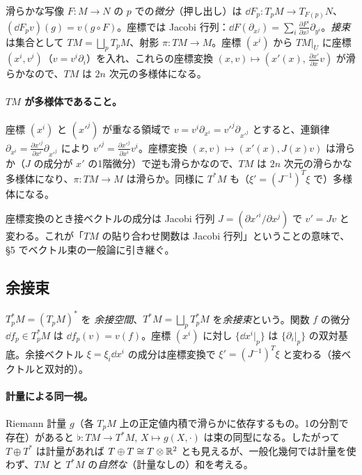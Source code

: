 \begin{defn}[微分、接束]
滑らかな写像 $F:M\to N$ の $p$ での\emph{微分}（押し出し）は $\dd F_p:T_pM\to T_{F(p)}N$、$(\dd F_p v)(g)=v(g\circ F)$。座標では Jacobi 行列：$\dd F(\partial_{x^j})=\sum_i \frac{\partial F^i}{\partial x^j}\partial_{y^i}$。\emph{接束}は集合として $TM=\bigsqcup_p T_pM$、射影 $\pi:TM\to M$。座標 $(x^i)$ から $TM|_U$ に座標 $(x^i,v^i)$（$v=v^i\partial_i$）を入れ、これらの座標変換 $(x,v)\mapsto(x'(x),\,\frac{\partial x'}{\partial x}v)$ が滑らかなので、$TM$ は $2n$ 次元の多様体になる。
\end{defn}

\paragraph{$TM$ が多様体であること。}座標 $(x^i)$ と $(x'^j)$ が重なる領域で $v=v^i\partial_{x^i}=v'^j\partial_{x'^j}$ とすると、連鎖律 $\partial_{x^i}=\frac{\partial x'^j}{\partial x^i}\partial_{x'^j}$ により $v'^j=\frac{\partial x'^j}{\partial x^i}v^i$。座標変換 $(x,v)\mapsto(x'(x),J(x)v)$ は滑らか（$J$ の成分が $x'$ の1階微分）で逆も滑らかなので、$TM$ は $2n$ 次元の滑らかな多様体になり、$\pi:TM\to M$ は滑らか。同様に $T^*M$ も（$\xi'=(J^{-1})^T\xi$ で）多様体になる。

座標変換のとき接ベクトルの成分は Jacobi 行列 $J=(\partial x'^i/\partial x^j)$ で $v'=Jv$ と変わる。これが「$TM$ の貼り合わせ関数は Jacobi 行列」ということの意味で、§5 でベクトル束の一般論に引き継ぐ。

\subsection{余接束}
\begin{defn}
$T^*_pM=(T_pM)^*$ を \emph{余接空間}、$T^*M=\bigsqcup_pT^*_pM$ を\emph{余接束}という。関数 $f$ の微分 $\dd f_p\in T_p^*M$ は $\dd f_p(v)=v(f)$。座標 $(x^i)$ に対し $\{\dd x^i|_p\}$ は $\{\partial_i|_p\}$ の双対基底。余接ベクトル $\xi=\xi_i\dd x^i$ の成分は座標変換で $\xi'=(J^{-1})^{T}\xi$ と変わる（接ベクトルと双対的）。
\end{defn}

\paragraph{計量による同一視。}Riemann 計量 $g$（各 $T_pM$ 上の正定値内積で滑らかに依存するもの。1の分割で存在）があると $\flat:TM\to T^*M$, $X\mapsto g(X,\cdot)$ は束の同型になる。したがって $T\oplus T^*$ は計量があれば $T\oplus T\cong T\otimes\mathbb R^2$ とも見えるが、一般化幾何では計量を使わず、$TM$ と $T^*M$ の\emph{自然な}（計量なしの）和を考える。

